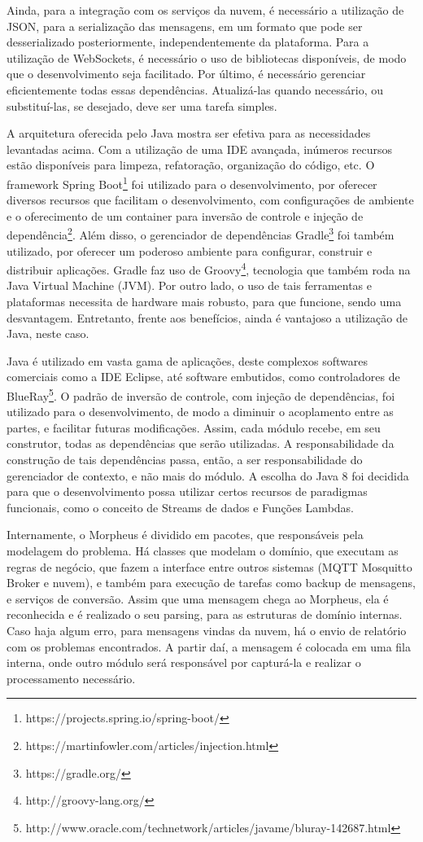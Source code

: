 Ainda, para a integração com os serviços da nuvem, é necessário a utilização de JSON, para a serialização das mensagens, em um formato que pode ser desserializado posteriormente, independentemente da plataforma. Para a utilização de WebSockets, é necessário o uso de bibliotecas disponíveis, de modo que o desenvolvimento seja facilitado. Por último, é necessário gerenciar eficientemente todas essas dependências. Atualizá-las quando necessário, ou substituí-las, se desejado, deve ser uma tarefa simples.

A arquitetura oferecida pelo Java mostra ser efetiva para as necessidades levantadas acima. Com a utilização de uma IDE avançada, inúmeros recursos estão disponíveis para limpeza, refatoração, organização do código, etc. O framework Spring Boot\footnote{https://projects.spring.io/spring-boot/} foi utilizado para o desenvolvimento, por oferecer diversos recursos que facilitam o desenvolvimento, com configurações de ambiente e o oferecimento de um container para inversão de controle e injeção de dependência\footnote{https://martinfowler.com/articles/injection.html}. Além disso, o gerenciador de dependências Gradle\footnote{https://gradle.org/} foi também utilizado, por oferecer um poderoso ambiente para configurar, construir e distribuir aplicações. Gradle faz uso de Groovy\footnote{http://groovy-lang.org/}, tecnologia que também roda na Java Virtual Machine (JVM). Por outro lado, o uso de tais ferramentas e plataformas necessita de hardware mais robusto, para que funcione, sendo uma desvantagem. Entretanto, frente aos benefícios, ainda é vantajoso a utilização de Java, neste caso.

Java é utilizado em vasta gama de aplicações, deste complexos softwares comerciais como a IDE Eclipse, até software embutidos, como controladores de BlueRay\footnote{http://www.oracle.com/technetwork/articles/javame/bluray-142687.html}. 
O padrão de inversão de controle, com injeção de dependências, foi utilizado para o desenvolvimento, de modo a diminuir o acoplamento entre as partes, e facilitar futuras modificações. Assim, cada módulo recebe, em seu construtor, todas as dependências que serão utilizadas. A responsabilidade da construção de tais dependências passa, então, a ser responsabilidade do gerenciador de contexto, e não mais do módulo. A escolha do Java 8 foi decidida para que o desenvolvimento possa utilizar certos recursos de paradigmas funcionais, como o conceito de Streams de dados e Funções Lambdas.

Internamente, o Morpheus é dividido em pacotes, que responsáveis pela modelagem do problema. Há classes que modelam o domínio, que executam as regras de negócio, que fazem a interface entre outros sistemas (MQTT Mosquitto Broker e nuvem), e também para execução de tarefas como backup de mensagens, e serviços de conversão.
Assim que uma mensagem chega ao Morpheus, ela é reconhecida e é realizado o seu parsing, para as estruturas de domínio internas. Caso haja algum erro, para mensagens vindas da nuvem, há o envio de relatório com os problemas encontrados. A partir daí, a mensagem é colocada em uma fila interna, onde outro módulo será responsável por capturá-la e realizar o processamento necessário.


